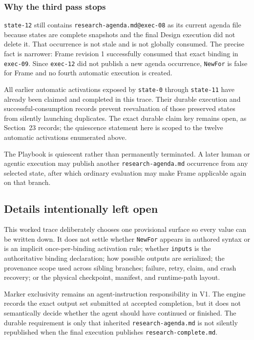 \documentclass[11pt]{article}
\newcommand{\artifact}[1]{\texttt{#1}}
\begin{document}
\subsubsection{Why the third pass stops}

\texttt{state-12} still contains \texttt{research-agenda.md@exec-08} as its
current agenda file because states are complete snapshots and the final Design
execution did not delete it. That occurrence is not stale and is not globally
consumed. The precise fact is narrower: Frame revision 1 successfully consumed
that exact binding in \texttt{exec-09}. Since \texttt{exec-12} did not publish
a new agenda occurrence, \artifact{NewFor} is false for Frame and no fourth
automatic execution is created.

All earlier automatic activations exposed by \texttt{state-0} through
\texttt{state-11} have already been claimed and completed in this trace. Their
durable execution and successful-consumption records prevent reevaluation of
those preserved states from silently launching duplicates. The exact durable
claim key remains open, as Section~23 records; the quiescence statement here is
scoped to the twelve automatic activations enumerated above.

The Playbook is quiescent rather than permanently terminated. A later human or
agentic execution may publish another \artifact{research-agenda.md} occurrence
from any selected state, after which ordinary evaluation may make Frame
applicable again on that branch.

\subsection{Details intentionally left open}

This worked trace deliberately chooses one provisional surface so every value
can be written down. It does not settle whether \artifact{NewFor} appears in
authored syntax or is an implicit once-per-binding activation rule; whether
\texttt{inputs} is the authoritative binding declaration; how possible outputs
are serialized; the provenance scope used across sibling branches; failure,
retry, claim, and crash recovery; or the physical checkpoint, manifest, and
runtime-path layout.

Marker exclusivity remains an agent-instruction responsibility in V1. The
engine records the exact output set submitted at accepted completion, but it
does not semantically decide whether the agent should have continued or
finished. The durable requirement is only that inherited
\artifact{research-agenda.md} is not silently republished when the final
execution publishes \artifact{research-complete.md}.
\end{document}
